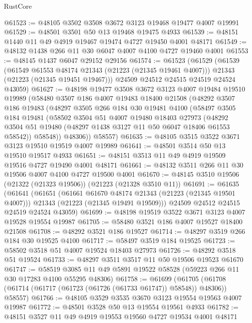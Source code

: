 \begin{lexlean}{RustCore}
\begin{coremodule}
@61523 := @48105 @3502 @3508 @3672 @3123 @19468 @19477 @4007 @19991
@61529 := @48501 @3501 @50 @13 @19468 @19475 @4933
@61539 := @48151 @1440 @11 @49 @4919 @19467 @19474 @4727 @19450 @4001 @48171
@61549 := @48132 @1438 @266 @11 @30 @6047 @4007 @4100 @4727 @19460 @4001
@61553 := @48145 @1437 @6047 @29152 @29156
@61574 := @61523
    (@61529
      (@61539
        (@61549 @61553 @48174 @21343 (@21223 (@21345 @19461 @4007)))
        @21343
        (@21223 (@21345 @19451 @19467)))
      @24509
      @24512
      @24515
      @24519
      @24524
      @43059)
@61627 := @48198
    @19477
    @3508
    @3672
    @3123
    @4007
    @19484
    @19510
    @19989
    (@58480
      @3507
      @186
      @4007
      @19483
      @18400
      @21508
      (@48292
        @3507
        @186
        @19483
        (@48297
          @3505
          @266
          @184
          @30
          @19481
          @4100
          (@58497
            @3505
            @184
            @19481
            (@58502
              @3504
              @51
              @4007
              @19480
              @18403
              @27973
              (@48292 @3504 @51 @19480 (@48297 @1438 @3127 @11 @50 @6047 @18406 @61553 @58542))
              @58548))
          @48306))
      @58557)
@61635 := @48105 @3515 @3522 @3671 @3123 @19510 @19519 @4007 @19989
@61641 := @48501 @3514 @50 @13 @19510 @19517 @4933
@61651 := @48151 @3513 @11 @49 @4919 @19509 @19516 @4727 @19490 @4001 @48171
@61661 := @48132 @3511 @266 @11 @30 @19506 @4007 @4100 @4727 @19500 @4001
@61670 := @48145 @3510 @19506 (@21322 (@21323 @19506)) (@21223 (@21328 @3510 @11))
@61691 := @61635
    (@61641
      (@61651
        (@61661 @61670 @48174 @21343 (@21223 (@21345 @19501 @4007)))
        @21343
        (@21223 (@21345 @19491 @19509)))
      @24509
      @24512
      @24515
      @24519
      @24524
      @43059)
@61699 := @48198 @19519 @3522 @3671 @3123 @4007 @19528 @19554 @19987
@61705 := @58480 @3521 @186 @4007 @19527 @18400 @21508
@61708 := @48292 @3521 @186 @19527
@61714 := @48297 @3519 @266 @184 @30 @19525 @4100
@61717 := @58497 @3519 @184 @19525
@61723 := @58502 @3518 @51 @4007 @19524 @18403 @27973
@61726 := @48292 @3518 @51 @19524
@61733 := @48297 @3511 @3517 @11 @50 @19506 @19523 @61670
@61747 := @58519 @3085 @11 @49 @5891 @19522 @58528 (@59223 @266 @11 @30 @17283 @4100 @55295 @48306)
@61758 := @61699
    (@61705 (@61708 (@61714 (@61717 (@61723 (@61726 (@61733 @61747)) @58548)) @48306)) @58557)
@61766 := @48105 @3529 @3535 @3670 @3123 @19554 @19563 @4007 @19987
@61772 := @48501 @3528 @50 @13 @19554 @19561 @4933
@61782 := @48151 @3527 @11 @49 @4919 @19553 @19560 @4727 @19534 @4001 @48171

\end{coremodule}
\end{lexlean}
